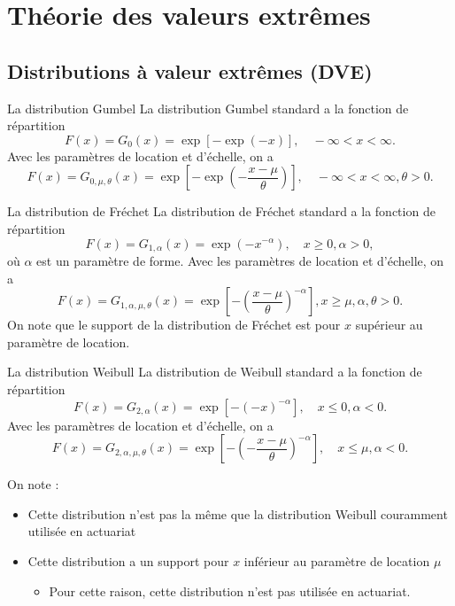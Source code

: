 \section{Théorie des valeurs extrêmes}

\subsection{Distributions à valeur extrêmes (DVE)}

\begin{definition}{La distribution Gumbel}{}
	La distribution Gumbel standard a la fonction de répartition
	$$F(x) = G_{0}(x) = \exp \left[-\exp(-x)\right], \quad -\infty <x<\infty.$$
	\tcblower
	Avec les paramètres de location et d'échelle, on a 
	$$F(x) = G_{0, \mu, \theta}(x) = \exp \left[-\exp\left(-\frac{x-\mu}{\theta}\right)\right], \quad -\infty <x<\infty, \theta>0.$$
\end{definition}

\begin{definition}{La distribution de Fréchet}{}
	La distribution de Fréchet standard a la fonction de répartition
	$$F(x) = G_{1, \alpha}(x) = \exp\left(-x^{-\alpha}\right), \quad x\geq 0, \alpha > 0,$$
	où $\alpha$ est un paramètre de forme. 
	\tcblower
	Avec les paramètres de location et d'échelle, on a
	$$F(x) = G_{1, \alpha, \mu, \theta}(x) = \exp\left[-\left(\frac{x-\mu}{\theta}\right)^{-\alpha}\right], x\geq \mu, \alpha, \theta > 0.$$
	On note que le support de la distribution de Fréchet est pour $x$ supérieur au paramètre de location. 
\end{definition}

\begin{definition}{La distribution Weibull}{}
	La distribution de Weibull standard a la fonction de répartition 
	$$F(x) = G_{2, \alpha}(x) = \exp\left[-\left(-x\right)^{-\alpha}\right], \quad x\leq 0, \alpha < 0.$$
	\tcblower
	Avec les paramètres de location et d'échelle, on a 
	$$F(x) = G_{2, \alpha, \mu, \theta}(x) = \exp\left[-\left(-\frac{x - \mu}{\theta}\right)^{-\alpha}\right], \quad x\leq \mu, \alpha < 0.$$
	
	On note :
	\begin{itemize}
		\item Cette distribution n'est pas la même que la distribution Weibull couramment utilisée en actuariat
		\item Cette distribution a un support pour $x$ inférieur au paramètre de location $\mu$
		\begin{itemize}
			\item Pour cette raison, cette distribution n'est pas utilisée en actuariat.
		\end{itemize}
	\end{itemize}
\end{definition}

